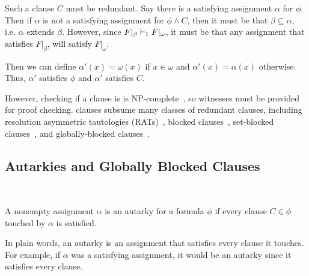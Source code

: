 Such a clause $C$ must be redundant. Say there is a satisfying assignment $\alpha$ for $\phi$. Then if $\alpha$ is not a satisfying assignment for $\phi \land C$, then it must be that $\beta \subseteq \alpha$, i.e. $\alpha$ extends $\beta$. However, since $F|_\beta \vdash_1 F|_\omega$, it must be that any assignment that satisfies $F|_\beta$, will satisfy $F|_\omega$. 

Then we can define $\alpha' (x) = \omega(x)$ if $x \in \omega$ and $\alpha'(x) = \alpha(x)$ otherwise. Thus, $\alpha'$ satisfies $\phi$ and $\alpha'$ satisfies $C$.




However, checking if a clause is \pr is NP-complete~\cite{prclause}, so witnesses must be provided for proof checking. \pr clauses subsume many classes of redundant clauses, including resolution asymmetric tautologies (RATs)~\cite{rat}, blocked clauses~\cite{blockedclause}, set-blocked clauses~\cite{setblocked}, and globally-blocked clauses~\cite{conditionalautarkies}.

\subsection{Autarkies and Globally Blocked Clauses}~\label{subsec:autarkies}


\begin{definition}[Autarky]
    A nonempty assignment $\alpha$ is an autarky for a formula $\phi$ if every clause $C \in \phi$ touched by $\alpha$ is satisfied.
\end{definition}


In plain words, an autarky is an assignment that satisfies every clause it touches. For example, if $\alpha$ was a satisfying assignment, it would be an autarky since it satisfies every clause.

